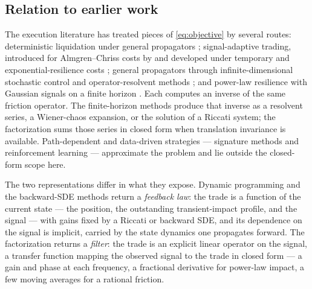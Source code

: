\documentclass[11pt]{article}
\theoremstyle{plain}
\theoremstyle{definition}
\theoremstyle{remark}
\begin{document}
\subsection{Relation to earlier work}\label{sec:relatedwork}

The execution literature has treated pieces of \eqref{eq:objective} by several routes: deterministic liquidation under general propagators \citep{GatheralSchiedSlynko2012}; signal-adaptive trading, introduced for Almgren--Chriss costs by \citet{CarteaJaimungal2013} and developed under temporary and exponential-resilience costs \citep{LehalleNeuman2019,NeumanVoss2022,BankSonerVoss2017}; general propagators through infinite-dimensional stochastic control \citep{AbiJaberNeuman2025} and operator-resolvent methods \citep{AbiJaberNeumanTuschmann2024}; and power-law resilience with Gaussian signals on a finite horizon \citep{FordeSanchezSmith2022}. Each computes an inverse of the same friction operator. The finite-horizon methods produce that inverse as a resolvent series, a Wiener-chaos expansion, or the solution of a Riccati system; the factorization sums those series in closed form when translation invariance is available. Path-dependent and data-driven strategies --- signature methods \citep{KalsiLyonsPerezArribas2020} and reinforcement learning --- approximate the problem and lie outside the closed-form scope here.

The two representations differ in what they expose. Dynamic programming and the backward-SDE methods return a \emph{feedback law}: the trade is a function of the current state --- the position, the outstanding transient-impact profile, and the signal --- with gains fixed by a Riccati or backward SDE, and its dependence on the signal is implicit, carried by the state dynamics one propagates forward. The factorization returns a \emph{filter}: the trade is an explicit linear operator on the signal, a transfer function mapping the observed signal to the trade in closed form --- a gain and phase at each frequency, a fractional derivative for power-law impact, a few moving averages for a rational friction.
\end{document}
